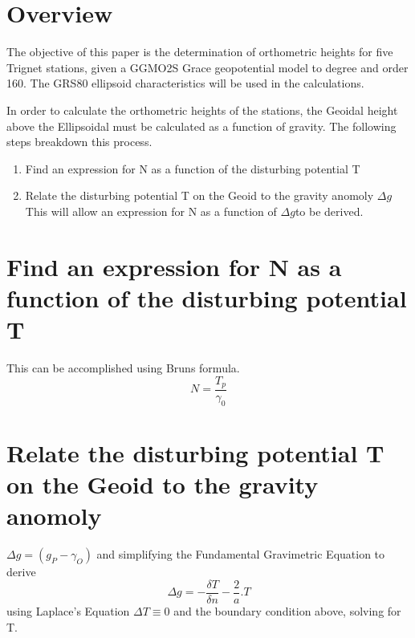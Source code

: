 
\section{Overview}
The objective of this paper is the determination of orthometric heights for five Trignet stations, given a GGMO2S Grace geopotential model to degree and order 160. The GRS80 ellipsoid characteristics will be used in the calculations.

In order to calculate the orthometric heights of the stations, the Geoidal height above the Ellipsoidal must be calculated as a function of gravity. The following steps breakdown this process.
\begin{enumerate}
	\item Find an expression for N as a function of the disturbing potential T
	\item Relate the disturbing potential T on the Geoid to the gravity anomoly $ \Delta g $
 This will allow an expression for N as a function of $ \Delta g $to be derived.
\end{enumerate}

\section{Find an expression for N as a function of the disturbing potential T }
This can be accomplished using Bruns formula.
\begin{equation} 
N = \dfrac{T_{p}}{\gamma_{0}}
\end{equation}

\section{Relate the disturbing potential T on the Geoid to the gravity anomoly}
$ \Delta g = (g_{P}- \gamma_{O})  $
and simplifying the Fundamental Gravimetric Equation to derive 
\begin{equation} 
\Delta g = -\dfrac{\delta T}{\delta n}-\dfrac{2}{a}.T
\end{equation}
using Laplace's Equation $ \Delta T \equiv 0 $
and the boundary condition above, solving for T.